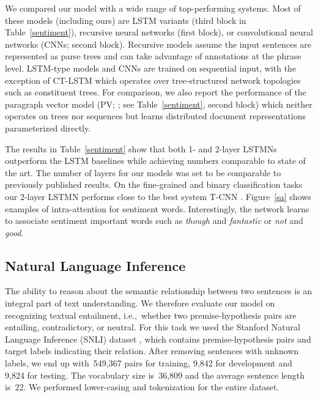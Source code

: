 \documentclass[11pt,letterpaper]{article}
\begin{document}
	
	We compared our model with a wide range of top-performing systems.
	Most of these models (including ours) are LSTM variants (third block
	in Table~\ref{sentiment}), recursive neural networks (first block), or
	convolutional neural networks (CNNs; second block). Recursive models
	assume the input sentences are represented as parse trees and can take
	advantage of annotations at the phrase level.  LSTM-type models and
	CNNs are trained on sequential input, with the exception of
	\mbox{CT-LSTM} \cite{tai2015improved} which operates over
	tree-structured network topologies such as constituent trees.  For
	comparison, we also report the performance of the paragraph vector
	model (PV; ; see Table~\ref{sentiment},
	second block) which neither operates on trees nor sequences but learns
	distributed document representations parameterized directly.
	
	
	The results in Table~\ref{sentiment} show that both 1- and
        2-layer LSTMNs outperform the LSTM baselines while achieving
        numbers comparable to state of the art.  The number of layers
        for our models was set to be comparable to previously
        published results. On the fine-grained and binary
        classification tasks our 2-layer LSTMN performs close to the
        best system T-CNN \cite{lei-barzilay-jaakkola:2015:EMNLP}.
        Figure~\ref{sa} shows examples of intra-attention for
        sentiment words. Interestingly, the network learns to
        associate sentiment important words such as \textsl{though}
        and \textsl{fantastic} or \textsl{not} and \textsl{good}.
	

	\subsection{Natural Language Inference}
	\label{sec:natur-lang-infer}
	
	The ability to reason about the semantic relationship between
        two sentences is an integral part of text understanding. We
        therefore evaluate our model on recognizing textual
        entailment, i.e.,~whether two premise-hypothesis pairs are
        entailing, contradictory, or neutral.  For this task we used
        the Stanford Natural Language Inference (SNLI) dataset
        \cite{bowman2015large}, which contains premise-hypothesis
        pairs and target labels indicating their relation. After
        removing sentences with unknown labels, we end up with~549,367
        pairs for training, 9,842 for development and 9,824 for
        testing. The vocabulary size is~36,809 and the average
        sentence length is~22. We performed lower-casing and tokenization for the entire dataset.
	
\end{document}

